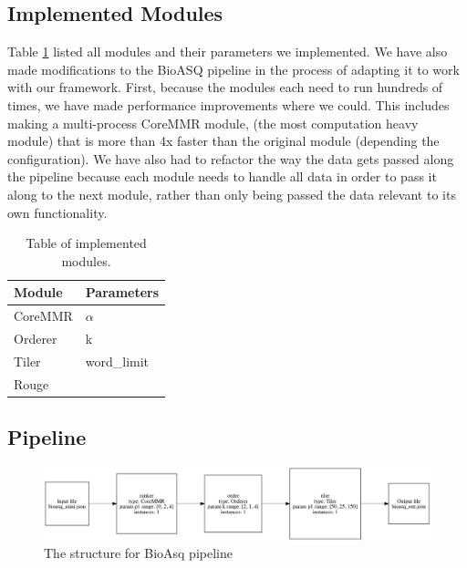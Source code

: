 \documentclass{article}
\begin{document}
    \subsection{Implemented Modules}
        Table \ref{tbl:modules} listed all modules and their parameters we implemented.
        We have also made modifications to the BioASQ pipeline in the process of adapting it to work with our framework.
        First, because the modules each need to run hundreds of times, we have made performance improvements where we could. This includes
        making a multi-process CoreMMR module, (the most computation heavy module) that is more than 4x faster than the original module (depending the configuration).
        We have also had to refactor the way the data gets passed along the pipeline because each module needs to handle all data in order to pass it
        along to the next module, rather than only being passed the data relevant to its own functionality.

        \begin{table}[h]
            \centering
            \begin{tabular}{|l|l|}
                \hline
                Module  & Parameters \\ \hline
                CoreMMR & $\alpha$           \\ \hline
                Orderer &  k          \\ \hline
                Tiler   &  word\_limit          \\ \hline
                Rouge   &            \\ \hline
            \end{tabular}
            \caption{Table of implemented modules.}
            \label{tbl:modules}
        \end{table}

    \subsection{Pipeline}
        \begin{figure}[H]
            \begin{center}
                \includegraphics[width=\textwidth]{fig/bioasq_pipeline.png}
            \end{center}
            \label{fig:bioasq_pipeline}
            \caption{The structure for BioAsq pipeline}
        \end{figure}
\end{document}
